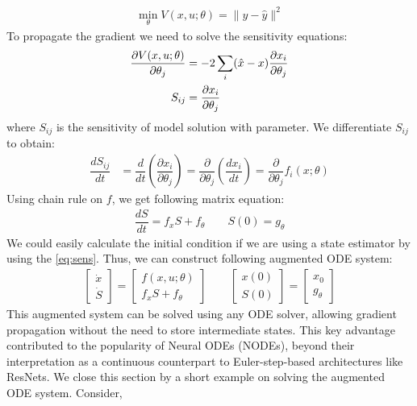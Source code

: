 \documentclass[fontsize=11pt]{article}
\newcommand{\norm}[1]{\lVert #1 \rVert}
\theoremstyle{definition}
\begin{document}
\begin{align}
    \min\limits_{\theta} V(x, u; \theta) = \norm{y - \hat{y}}^2 
\end{align}
To propagate the gradient we need to solve the sensitivity equations:
\begin{align}
    \dfrac{\partial V(x, u; \theta)}{\partial \theta_j} &= -2 \sum_i (\hat{x} - x) \dfrac{\partial x_i}{\partial \theta_j} \notag \\ 
    S_{ij} &= \dfrac{\partial x_i}{\partial \theta_j}
    \label{eq:sens}
\end{align}
where $S_{ij}$ is the sensitivity of model solution with parameter. We differentiate $S_{ij}$ to obtain:
\begin{align}
    \dfrac{d S_{ij}}{dt} &= \dfrac{d}{dt} \left(\dfrac{\partial x_i}{\partial \theta_j}\right) =
    \dfrac{\partial}{\partial\theta_j} \left(\dfrac{d x_i}{dt}\right) = 
    \dfrac{\partial }{\partial \theta_j} f_i(x; \theta) 
\end{align}
Using chain rule on $f$, we get following matrix equation:
\begin{align}
    \dfrac{dS}{dt} = f_xS + f_{\theta} \qquad  S(0) = g_\theta
\end{align}
We could easily calculate the initial condition 
if we are using a state estimator by using the \cref{eq:sens}. Thus, we can construct
following augmented ODE system:
\begin{align}
    \begin{bmatrix} \dot{x} \\ \dot{S} \end{bmatrix} = 
    \begin{bmatrix} f(x, u; \theta) \\ f_xS + f_{\theta} \end{bmatrix}
    \qquad
    \begin{bmatrix} x(0) \\ S(0) \end{bmatrix} =
    \begin{bmatrix} x_0 \\ g_\theta \end{bmatrix}
    \label{eq:augsens}
\end{align}
This augmented system can be solved using any ODE solver, allowing gradient 
propagation without the need to store intermediate states. This key advantage 
contributed to the popularity of Neural ODEs (NODEs), beyond their interpretation 
as a continuous counterpart to Euler-step-based architectures like ResNets. We close 
this section by a short example on solving the augmented ODE system. Consider, 
\end{document}
